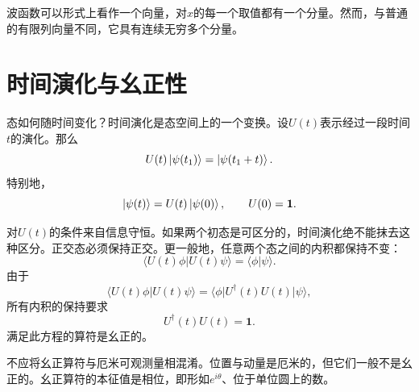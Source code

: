 波函数可以形式上看作一个向量，对\(x\)的每一个取值都有一个分量。然而，与普通的有限列向量不同，它具有连续无穷多个分量。

\begin{classroomqa}
\end{classroomqa}

\section{时间演化与幺正性}

态如何随时间变化？时间演化是态空间上的一个变换。设\(U(t)\)表示经过一段时间\(t\)的演化。那么
\begin{equation}
U(t)\left\lvert\psi(t_1)\right\rangle=\left\lvert\psi(t_1+t)\right\rangle.
\end{equation}
特别地，
\begin{equation}
\left\lvert\psi(t)\right\rangle=U(t)\left\lvert\psi(0)\right\rangle,
\qquad
U(0)=\mathbf 1.
\end{equation}

对\(U(t)\)的条件来自信息守恒。如果两个初态是可区分的，时间演化绝不能抹去这种区分。正交态必须保持正交。更一般地，任意两个态之间的内积都保持不变：
\begin{equation}
\langle U(t)\phi|U(t)\psi\rangle
=\langle\phi|\psi\rangle.
\end{equation}
由于
\begin{equation}
\langle U(t)\phi|U(t)\psi\rangle
=\langle\phi|U^\dagger(t)U(t)|\psi\rangle,
\end{equation}
所有内积的保持要求
\begin{equation}
U^\dagger(t)U(t)=\mathbf 1.
\end{equation}
满足此方程的算符是幺正的。

\begin{classroomqa}
\end{classroomqa}


不应将幺正算符与厄米可观测量相混淆。位置与动量是厄米的，但它们一般不是幺正的。幺正算符的本征值是相位，即形如\(e^{i\theta}\)、位于单位圆上的数。

